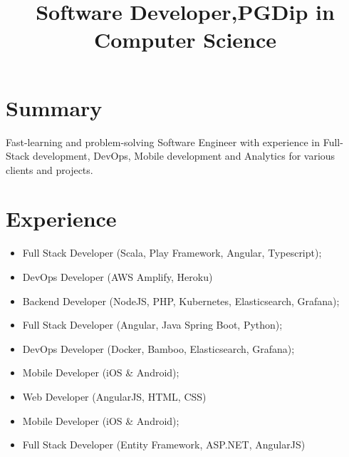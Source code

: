 \documentclass[12pt,a4paper,sans,colorlinks=true, urlcolor=blue]{moderncv}        %
\title{Software Developer,\newline PGDip in Computer Science}                               %
\begin{document}
\makecvtitle

\section{Summary}
Fast-learning and problem-solving Software Engineer with experience in Full-Stack development, DevOps, Mobile development and Analytics for various clients and projects.

\section{Experience}

{\begin{itemize}
		\item Full Stack Developer (Scala, Play Framework, Angular, Typescript);
            \item DevOps Developer (AWS Amplify, Heroku)
\end{itemize}}

{\begin{itemize}
		\item Backend Developer (NodeJS, PHP, Kubernetes, Elasticsearch, Grafana);
\end{itemize}}

{\begin{itemize}
		\item Full Stack Developer (Angular, Java Spring Boot, Python);
		\item DevOps Developer (Docker, Bamboo, Elasticsearch, Grafana);
\end{itemize}}

{\begin{itemize}
		\item Mobile Developer (iOS \& Android);
		\item Web Developer (AngularJS, HTML, CSS)
\end{itemize}}

{\begin{itemize}
		\item Mobile Developer (iOS \& Android);
		\item Full Stack Developer (Entity Framework, ASP.NET, AngularJS)
\end{itemize}}
\end{document}
